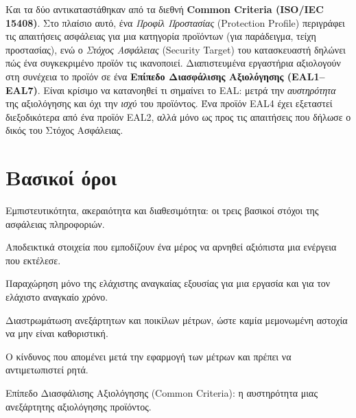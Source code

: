 \documentclass[11pt,openany]{book}
\begin{document}
Και τα δύο αντικαταστάθηκαν από τα διεθνή \textbf{Common Criteria (ISO/IEC 15408)}. Στο πλαίσιο αυτό, ένα \emph{Προφίλ Προστασίας} (Protection Profile) περιγράφει τις απαιτήσεις ασφάλειας για μια κατηγορία προϊόντων (για παράδειγμα, τείχη προστασίας), ενώ ο \emph{Στόχος Ασφάλειας} (Security Target) του κατασκευαστή δηλώνει πώς ένα συγκεκριμένο προϊόν τις ικανοποιεί. Διαπιστευμένα εργαστήρια αξιολογούν στη συνέχεια το προϊόν σε ένα \textbf{Επίπεδο Διασφάλισης Αξιολόγησης (EAL1–EAL7)}. Είναι κρίσιμο να κατανοηθεί τι σημαίνει το EAL: μετρά την \emph{αυστηρότητα} της αξιολόγησης και όχι την \emph{ισχύ} του προϊόντος. Ένα προϊόν EAL4 έχει εξεταστεί διεξοδικότερα από ένα προϊόν EAL2, αλλά μόνο ως προς τις απαιτήσεις που δήλωσε ο δικός του Στόχος Ασφάλειας.

\section*{Βασικοί όροι}
\begin{description}[style=nextline,leftmargin=1.2em]
  \item[Τριάδα CIA] Εμπιστευτικότητα, ακεραιότητα και διαθεσιμότητα: οι τρεις βασικοί στόχοι της ασφάλειας πληροφοριών.
  \item[Μη αποποίηση] Αποδεικτικά στοιχεία που εμποδίζουν ένα μέρος να αρνηθεί αξιόπιστα μια ενέργεια που εκτέλεσε.
  \item[Ελάχιστο προνόμιο] Παραχώρηση μόνο της ελάχιστης αναγκαίας εξουσίας για μια εργασία και για τον ελάχιστο αναγκαίο χρόνο.
  \item[Άμυνα σε βάθος] Διαστρωμάτωση ανεξάρτητων και ποικίλων μέτρων, ώστε καμία μεμονωμένη αστοχία να μην είναι καθοριστική.
  \item[Υπολειπόμενος κίνδυνος] Ο κίνδυνος που απομένει μετά την εφαρμογή των μέτρων και πρέπει να αντιμετωπιστεί ρητά.
  \item[EAL] Επίπεδο Διασφάλισης Αξιολόγησης (Common Criteria): η αυστηρότητα μιας ανεξάρτητης αξιολόγησης προϊόντος.
\end{description}
\end{document}
